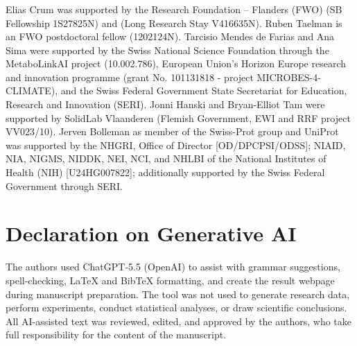 \documentclass[runningheads]{llncs}
\begin{document}
\begin{credits}
\subsubsection{\ackname} 
Elias Crum was supported by the Research Foundation – Flanders (FWO) (SB Fellowship 1S27825N) and (Long Research Stay V416635N).
Ruben Taelman is an FWO postdoctoral fellow (1202124N).
Tarcisio Mendes de Farias and Ana Sima were supported by the Swiss National Science Foundation through the MetaboLinkAI project (10.002.786), European Union’s Horizon Europe research and innovation programme (grant No. 101131818 - project MICROBES-4-CLIMATE), and the Swiss Federal Government State Secretariat for Education, Research and Innovation (SERI).
Jonni Hanski and Bryan-Elliot Tam were supported by SolidLab Vlaanderen (Flemish Government, EWI and RRF project VV023/10).
Jerven Bolleman as member of the Swiss-Prot group and UniProt was supported by the NHGRI, Office of Director [OD/DPCPSI/ODSS]; NIAID, NIA, NIGMS, NIDDK, NEI, NCI, and NHLBI of the National Institutes of Health (NIH) [U24HG007822]; additionally supported by the Swiss Federal Government through SERI.
\end{credits}

\section*{Declaration on Generative AI}
The authors used ChatGPT-5.5 (OpenAI) to assist with grammar suggestions, spell-checking, LaTeX and BibTeX formatting, and create the result webpage\cite{fedSurveyResultsRepo} during manuscript preparation. 
The tool was not used to generate research data, perform experiments, conduct statistical analyses, or draw scientific conclusions. 
All AI-assisted text was reviewed, edited, and approved by the authors, who take full responsibility for the content of the manuscript.



\end{document}
